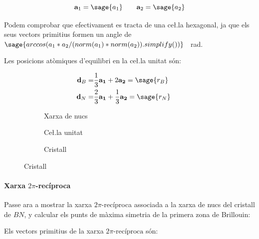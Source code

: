 \documentclass[12pt]{article} %
\let\vec\mathbf %
\begin{document}
{\begin{equation}
\vec a_1=\sage{a_1}\qquad\vec a_2=\sage{a_2} 
\end{equation}

Podem comprobar que efectivament es tracta de una ce\l.la hexagonal, ja que els seus vectors primitius formen un angle de $\sage{arccos(a_1*a_2/(norm(a_1)*norm(a_2)).simplify())}$ \SI{}{\radian}.

Les posicions atòmiques d'equilibri en la ce\l.la unitat són:

\begin{equation}\begin{split}
\vec d_B=&\frac{1}{3}\vec{a_1}+2\vec{a_2}=\sage{r_B}\qquad\\
\vec d_N=&\frac{2}{3}\vec{a_1}+\frac{1}{3}\vec{a_2}=\sage{r_N} 
\end{split}\end{equation} 



\begin{figure}[h]
\centering
\begin{subfigure}[b]{0.3\textwidth}
\centering
{}
\caption{Xarxa de nucs}
\end{subfigure}
\begin{subfigure}[b]{0.3\textwidth}
\centering
{}
\caption{Ce\l.la unitat}
\end{subfigure}
\begin{subfigure}[b]{0.3\textwidth}
\centering
{}
\caption{Cristall}
\end{subfigure}
\end{figure}



\paragraph{Xarxa $2\pi$-recíproca}
Passe ara a mostrar la xarxa $2\pi$-recíproca associada a la xarxa de nucs del cristall de $BN$, y calcular els punts de màxima simetria de la primera zona de Brillouin:

Els vectors primitius de la xarxa $2\pi\text{-recíproca}$ són:

}
\end{document}
